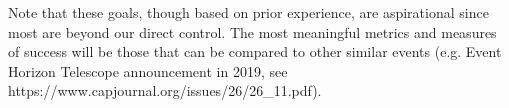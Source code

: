 Note that these goals, though based on prior experience, are aspirational since most are
beyond our direct control. The most meaningful metrics and measures of success will be
those that can be compared to other similar events (e.g. Event Horizon Telescope announcement
in 2019, see https://www.capjournal.org/issues/26/26\_11.pdf). 



  